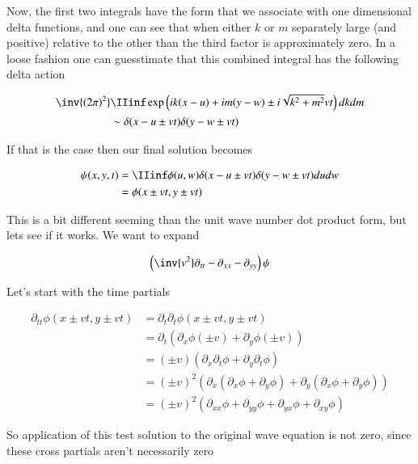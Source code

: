 Now, the first two integrals have the form that we associate with one dimensional delta functions, and one can see that when either 
$k$ or $m$ separately large (and positive) relative to the other than the third factor is approximately zero.  In a loose fashion one
can guesstimate that this combined integral has the following delta action

\begin{align*}
\inv{({2\pi})^2} &\IIinf \exp\left( i k (x-u) + i m (y-w) \pm i \sqrt{k^2 + m^2} v t \right) dk dm \\
&\sim 
\delta( x -u \pm vt )
\delta( y -w \pm vt )
\end{align*}

If that is the case then our final solution becomes

\begin{align*}
\psi(x,y,t) 
&= \IIinf \phi(u,w) \delta( x -u \pm vt ) \delta( y -w \pm vt ) du dw \\
&= \phi( x \pm vt, y \pm vt ) \\
\end{align*}

This is a bit different seeming than the unit wave number dot product form, but lets see if it works.  We want to expand

\begin{align*}
\left(\inv{v^2} \partial_{tt} -\partial_{xx} -\partial_{yy} \right)\psi
\end{align*}

Let's start with the time partials

\begin{align*}
\partial_{tt} \phi( x \pm vt, y \pm vt ) 
&=
\partial_{t} \partial_t \phi( x \pm vt, y \pm vt ) \\
&= \partial_{t} ( \partial_x \phi (\pm v) +\partial_y \phi (\pm v) ) \\
&= (\pm v)( \partial_{x} \partial_t \phi  + \partial_y \partial_t \phi ) \\
&= (\pm v)^2( \partial_{x} (\partial_x \phi + \partial_y \phi)  + \partial_y (\partial_x \phi + \partial_y \phi)) \\
&= (\pm v)^2( \partial_{xx} \phi +\partial_{yy} \phi +\partial_{yx} \phi +\partial_{xy} \phi )
\end{align*}

So application of this test solution to the original wave equation is not zero, since these cross partials aren't necessarily zero

